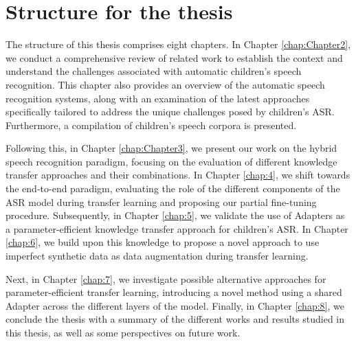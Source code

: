 \section{Structure for the thesis}
The structure of this thesis comprises eight chapters. In Chapter \ref{chap:Chapter2}, we conduct a comprehensive review of related work to establish the context and understand the challenges associated with automatic children's speech recognition. This chapter also provides an overview of the automatic speech recognition systems, along with an examination of the latest approaches specifically tailored to address the unique challenges posed by children's ASR. Furthermore, a compilation of children's speech corpora is presented.

Following this, in Chapter \ref{chap:Chapter3}, we present our work on the hybrid speech recognition paradigm, focusing on the evaluation of different knowledge transfer approaches and their combinations. In Chapter \ref{chap:4}, we shift towards the end-to-end paradigm, evaluating the role of the different components of the ASR model during transfer learning and proposing our partial fine-tuning procedure. Subsequently, in Chapter \ref{chap:5}, we validate the use of Adapters as a parameter-efficient knowledge transfer approach for children's ASR. In Chapter \ref{chap:6}, we build upon this knowledge to propose a novel approach to use imperfect synthetic data as data augmentation during transfer learning.

Next, in Chapter \ref{chap:7}, we investigate possible alternative approaches for parameter-efficient transfer learning, introducing a novel method using a shared Adapter across the different layers of the model. Finally, in Chapter \ref{chap:8}, we conclude the thesis with a summary of the different works and results studied in this thesis, as well as some perspectives on future work. 
